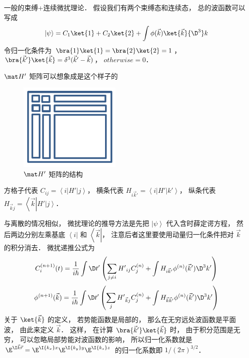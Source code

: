 

一般的束缚+连续微扰理论． 假设我们有两个束缚态和连续态， 总的波函数可以写成
 \begin{equation}
\left| \psi  \right\rangle  = {C_1}\ket{1}  + {C_2}\ket{2}  + \int {\phi (\vec k)\ket{\vec k}{\D ^3}k} 
\end{equation}
令归一化条件为 $\bra{1}\ket{1} = \bra{2}\ket{2} = 1$，  $\bra{\vec k'}\ket{\vec k}  = {\delta ^3}(\vec k' - \vec k)$，  $otherwise = 0$． 

 $\mat H'$  矩阵可以想象成是这个样子的
\begin{figure}[ht]
\centering
\includegraphics[width=5cm]{./figures/PTCont.pdf}
\caption{$\mat H'$ 矩阵的结构} 
\end{figure}

方格子代表 ${C_{ij}} = \left\langle i \right|H'\left| j \right\rangle $，  横条代表 ${H_{i\vec k'}} = \left\langle i \right|H'\left| {k'} \right\rangle $，  纵条代表 ${H_{\vec kj}} = \left\langle {\vec k} \right|H'\left| j \right\rangle $． 

与离散的情况相似， 微扰理论的推导方法是先把 $\left| \psi  \right\rangle $ 代入含时薛定谔方程， 然后两边分别左乘基底 $\left\langle i \right|$ 和 $\left\langle {\vec k} \right|$，  注意后者这里要使用动量归一化条件把对 $\vec k$ 的积分消去． 微扰递推公式为
 \begin{equation}
C_i^{(n + 1)}(t) = \frac{1}{i\hbar }\int {\D t'\left( {\sum\limits_{j \ne i} {{{H'}_{ij}}C_j^{(n)}}  + \int {{H_{i\vec k'}}{\phi ^{(n)}}(\vec k'){\D ^3}k'} } \right)} 
\end{equation}
 \begin{equation}
 {\phi ^{(n + 1)}}(\vec k) = \frac{1}{i\hbar }\int {\D t'\left( {\sum\limits_j {{{H'}_{\vec kj}}C_j^{(n)}}  + \int {{H_{\vec k\vec k'}}{\phi ^{(n)}}(\vec k'){\D ^3}k'} } \right)} 
\end{equation}
关于 $\ket{\vec k}$  的定义， 若势能函数是局部的， 那么在无穷远处波函数是平面波， 由此来定义 $\vec k$．  这样， 在计算 $\bra{\vec k'}\ket{\vec k}$ 时， 由于积分范围是无穷， 可以忽略局部势能对波函数的影响， 所以归一化系数就是 ${\E^{\I \vec k\vec r}} = {\E^{\I{k_x}x}}{\E^{\I{k_y}y}}{\E^{\I{k_z}z}}$ 的归一化系数即 $1/{(2\pi )^{3/2}}$． 
 

